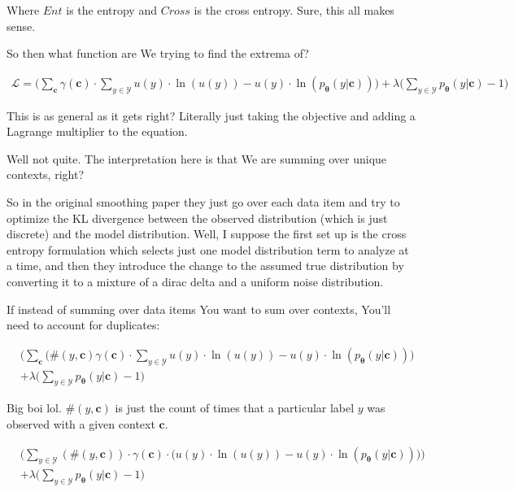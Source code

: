 \documentclass{article}
\newcommand{\vtheta}{\boldsymbol{\theta}}
\newcommand{\model}{p_{\vtheta}}
\newcommand{\context}{\boldsymbol{c}}
\begin{document}
			Where $Ent$ is the entropy and $Cross$ is the cross entropy. Sure, this all makes sense. 
			
			So then what function are We trying to find the extrema of? 
			
			\begin{align}
				\mathcal{L} = \bigg(\sum_{\context} \gamma(\context)\cdot\sum_{y\in\mathcal{Y}} u(y)\cdot\ln(u(y)) - u(y)\cdot\ln(\model(y|\context))\bigg) + \lambda\bigg(\sum_{y\in\mathcal{Y}} \model(y|\context) -1 \bigg)
			\end{align}
			
			This is as general as it gets right? Literally just taking the objective and adding a Lagrange multiplier to the equation. 

			Well not quite. The interpretation here is that We are summing over unique contexts, right?
			
			So in the original smoothing paper they just go over each data item and try to optimize the KL divergence between the observed distribution (which is just discrete) and the model distribution. Well, I suppose the first set up is the cross entropy formulation which selects just one model distribution term to analyze at a time, and then they introduce the change to the assumed true distribution by converting it to a mixture of a dirac delta and a uniform noise distribution.
		
			If instead of summing over data items You want to sum over contexts, You'll need to account for duplicates:
			
			\begin{align}
				&\bigg(\sum_{\context} (\#(y, \context)\gamma(\context)\cdot\sum_{y\in\mathcal{Y}} u(y)\cdot\ln(u(y)) - u(y)\cdot\ln(\model(y|\context))\bigg) \\
			&+ \lambda\bigg(\sum_{y\in\mathcal{Y}} \model(y|\context) -1 \bigg)
			\end{align}
			
			Big boi lol. $\#(y, \context)$ is just the count of times that a particular label $y$ was observed with a given context $\context$.
			
			\begin{align}
				&\bigg(\sum_{y\in\mathcal{Y}} (\#(y, \context))\cdot \gamma(\context)\cdot \big( u(y)\cdot\ln(u(y)) - u(y)\cdot\ln(\model(y|\context))\big)\bigg) \\
			&+ \lambda\bigg(\sum_{y\in\mathcal{Y}} \model(y|\context) -1 \bigg)
			\end{align}
			
\end{document}
